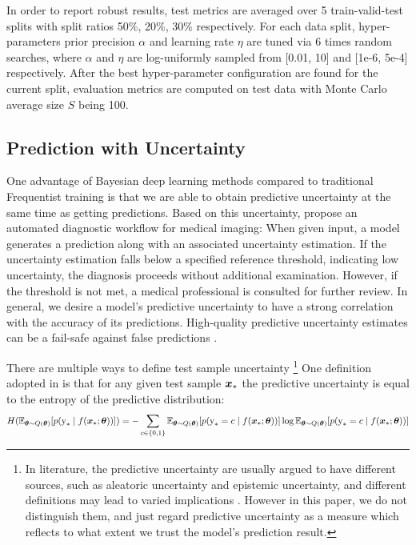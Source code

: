 \documentclass[10pt]{article} %
\begin{document}
In order to report robust results, test metrics are averaged over 5 train-valid-test splits with split ratios  50\%, 20\%, 30\% respectively. For each data split, hyper-parameters prior precision $\alpha$ and learning rate $\eta$ are tuned via 6 times random searches, where $\alpha$ and $\eta$ are log-uniformly sampled from [0.01, 10] and [1e-6, 5e-4] respectively. After the best hyper-parameter configuration are found for the current split, evaluation metrics are computed on test data with Monte Carlo average size $S$ being 100.

\subsection{Prediction with Uncertainty}
One advantage of Bayesian deep learning methods compared to traditional Frequentist training is that we are able to obtain predictive uncertainty at the same time as getting predictions. Based on this uncertainty, \citet{band2022benchmarking} propose an automated diagnostic workflow for medical imaging: When given input, a model generates a prediction along with an associated uncertainty estimation. If the uncertainty estimation falls below a specified reference threshold, indicating low uncertainty, the diagnosis proceeds without additional examination. However, if the threshold is not met, a medical professional is consulted for further review. In general, we desire a model's predictive uncertainty to have a strong correlation with the accuracy of its predictions. High-quality predictive uncertainty estimates can be a fail-safe against false predictions 
\citep{band2022benchmarking}. 

There are multiple ways to define test sample uncertainty \footnote{In literature, the predictive uncertainty are usually argued to have different sources, such as aleatoric uncertainty and epistemic uncertainty, and different definitions may lead to varied implications \citep{ulmer2023prior, d2021repulsive}. However in this paper, we do not distinguish them, and just regard predictive uncertainty as a measure which reflects to what extent we trust the model's prediction result.} One definition adopted in \citet{band2022benchmarking} is that for any given test sample ${\bm{x}}_*$ the predictive uncertainty is equal to the entropy of the predictive distribution: 
\begin{equation}
H(\mathbb{E}_{{\bm{\theta}} \sim Q({\bm{\theta}})}[p({\textnormal{y}}_* \mid f({\bm{x}}_* ; {\bm{\theta}}))])=-\sum_{c \in\{0,1\}} \mathbb{E}_{{\bm{\theta}} \sim Q({\bm{\theta}})}[p({\textnormal{y}}_*=c \mid f({\bm{x}}_* ; {\bm{\theta}}))] \log \mathbb{E}_{{\bm{\theta}} \sim Q({\bm{\theta}})} [p({\textnormal{y}}_*=c \mid f({\bm{x}}_* ; {\bm{\theta}}))]
\end{equation}
\end{document}
